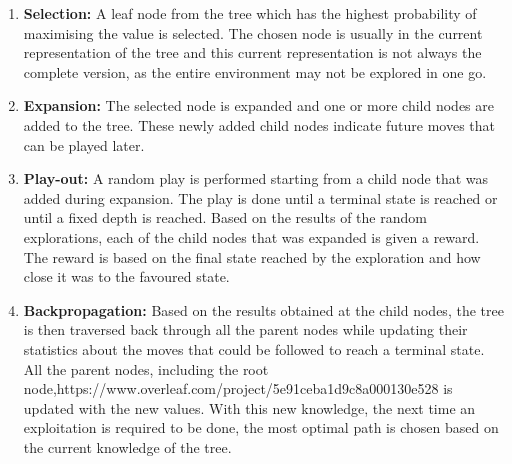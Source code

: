 \documentclass{svproc}
\begin{document}
    \begin{enumerate}

        \item \textbf{{Selection:}} A leaf node from the tree which has the highest probability of maximising the value is selected. The chosen node is usually in the current representation of the tree and this current representation is not always the complete version, as the entire environment may not be explored in one go.
        
        \item \textbf{{Expansion:}} The selected node is expanded and one or more child nodes are added to the tree. These newly added child nodes indicate future moves that can be played later.
        
        \item \textbf{{Play-out:}} A random play is performed starting from a child node that was added during expansion. The play is done until a terminal state is reached or until a fixed depth is reached. Based on the results of the random explorations, each of the child nodes that was expanded is given a reward. The reward is based on the final state reached by the exploration and how close it was to the favoured state.
        
        \item \textbf{{Backpropagation:}} Based on the results obtained at the child nodes, the tree is then traversed back through all the parent nodes while updating their statistics about the moves that could be followed to reach a terminal state. All the parent nodes, including the root node,https://www.overleaf.com/project/5e91ceba1d9c8a000130e528 is updated with the new values. With this new knowledge, the next time an exploitation is required to be done, the most optimal path is chosen based on the current knowledge of the tree.

    \end{enumerate}
    



\end{document}
